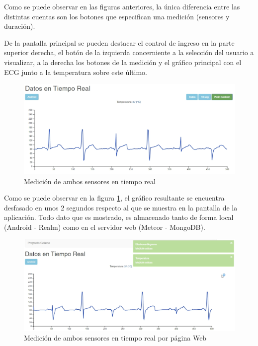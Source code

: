 Como se puede observar en las figuras anteriores, la única diferencia entre las distintas cuentas son los botones que especifican una medición (sensores y duración).

De la pantalla principal se pueden destacar el control de ingreso en la parte superior derecha, el botón de la izquierda concerniente a la selección del usuario a visualizar, a la derecha los botones de la medición y el gráfico principal con el ECG junto a la temperatura sobre este último.

\begin{figure}[H]
	\centering
	\includegraphics[scale=0.4]{figuras/protof/medicion.png}
	\caption{Medición de ambos sensores en tiempo real}
	\label{medicion}
\end{figure}

Como se puede observar en la figura \ref{medicion}, el gráfico resultante se encuentra desfasado en unos 2 segundos respecto al que se muestra en la pantalla de la aplicación. Todo dato que es mostrado, es almacenado tanto de forma local (Android - Realm) como en el servidor web (Meteor - MongoDB).

\begin{figure}[H]
	\centering
	\includegraphics[scale=0.4]{figuras/protof/medicionPc.png}
	\caption{Medición de ambos sensores en tiempo real por página Web}
	\label{medicionPc}
\end{figure}


